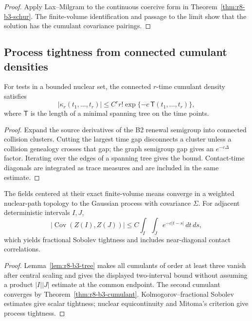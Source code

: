 \begin{proof}
Apply Lax--Milgram to the continuous coercive form in
Theorem~\ref{thm:r8-b3-schur}.  The finite-volume identification and passage to
the limit show that the solution has the cumulant covariance pairings.
\end{proof}

\subsection{Process tightness from connected cumulant densities}

\begin{lemma}
\label{lem:r8-b3-tree}
For tests in a bounded nuclear set, the connected $r$-time cumulant density
satisfies
\[
 |\kappa_r(t_1,\ldots,t_r)|
 \le C^r r!\exp\{-c\,\mathsf T(t_1,\ldots,t_r)\},
\]
where $\mathsf T$ is the length of a minimal spanning tree on the time points.
\end{lemma}

\begin{proof}
Expand the source derivatives of the B2 renewal semigroup into connected
collision clusters.  Cutting the largest time gap disconnects a cluster unless
a collision genealogy crosses that gap; the graph semigroup gap gives an
$e^{-c\Delta}$ factor.  Iterating over the edges of a spanning tree gives the
bound.  Contact-time diagonals are integrated as trace measures and are
included in the same estimate.
\end{proof}

\begin{theorem}
\label{thm:r8-b3-process}
The fields centered at their exact finite-volume means converge in a weighted
nuclear-path topology to the Gaussian process with covariance $\Sigma$.
For adjacent deterministic intervals $I,J$,
\[
 |\operatorname{Cov}(Z(I),Z(J))|
 \le C\int_I\int_J e^{-c|t-s|}\,dt\,ds,
\]
which yields fractional Sobolev tightness and includes near-diagonal contact
correlations.
\end{theorem}

\begin{proof}
Lemma~\ref{lem:r8-b3-tree} makes all cumulants of order at least three vanish
after central scaling and gives the displayed two-interval bound without
assuming a product $|I||J|$ estimate at the common endpoint.  The second
cumulant converges by Theorem~\ref{thm:r8-b3-cumulant}.  Kolmogorov--fractional
Sobolev estimates give scalar tightness; nuclear equicontinuity and Mitoma's
criterion give process tightness.
\end{proof}
